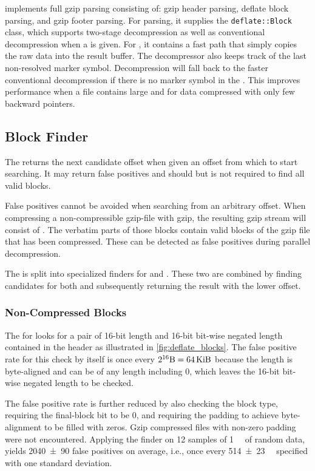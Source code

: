 \Pragzip implements full gzip parsing consisting of: gzip header parsing, deflate block parsing, and gzip footer parsing.
For  parsing, it supplies the \texttt{deflate::Block} class, which supports two-stage decompression as well as conventional decompression when a \backrefwindow is given.
For \rawblocks, it contains a fast path that simply copies the raw data into the result buffer.
The  decompressor also keeps track of the last non-resolved marker symbol.
Decompression will fall back to the faster conventional decompression if there is no marker symbol in the \backrefwindow.
This improves performance when a file contains large \rawblocks and for data compressed with only few backward pointers.


\subsection{Block Finder}

The \blockfinder returns the next  candidate offset when given an offset from which to start searching.
It may return false positives and should but is not required to find all valid  blocks.

False positives cannot be avoided when searching from an arbitrary offset.
When compressing a non-compressible gzip-file with gzip, the resulting gzip stream will consist of \rawblocks.
The verbatim parts of those blocks contain valid  blocks of the gzip file that has been compressed.
These can be detected as false positives during parallel decompression.

The \blockfinder is split into specialized  finders for \dynblocks and \rawblocks.
These two are combined by finding candidates for both and subsequently returning the result with the lower offset.


\subsubsection{Non-Compressed Blocks}

The \blockfinder for \rawblocks looks for a pair of 16-bit length and 16-bit bit-wise negated length contained in the header as illustrated in \cref{fig:deflate_blocks}.
The false positive rate for this check by itself is once every $2^{16}\SI{}{\byte} = \SI{64}{\kibi\byte}$ because the length is byte-aligned and can be of any length including $0$, which leaves the 16-bit bit-wise negated length to be checked.

The false positive rate is further reduced by also checking the block type, requiring the final-block bit to be 0, and requiring the padding to achieve byte-alignment to be filled with zeros.
Gzip compressed files with non-zero padding were not encountered.
Applying the \rawblock finder on 12 samples of \SI{1}{\gibi\byte} of random data, yields \SI{2040(90)}{} false positives on average, i.e., once every \SI{514(23)}{\kibi\byte} specified with one standard deviation.

